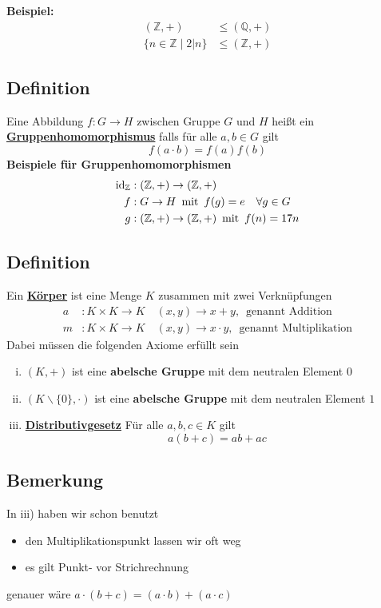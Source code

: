 \textbf{Beispiel:}
\begin{align*}
( \mathds{Z}, +) &\leq (\mathds{Q},+) \\
\{ n  \in \mathds{Z} \mid 2|n \} &\leq (\mathds{Z},+)
\end{align*}

\subsection{Definition}
Eine Abbildung \(f: G \rightarrow H \) zwischen Gruppe \(G\) und \(H\) heißt ein 
\underline{\textbf{Gruppenhomomorphismus}} falls für alle \(a,b \in G\) gilt
\[
f(a \cdot b) = f(a) f(b)
\]
\textbf{Beispiele für Gruppenhomomorphismen}
\begin{align*}
\operatorname{id}_{\mathbb{Z}} &: (\mathbb{Z},+) \rightarrow (\mathbb{Z},+) \\
f &: G \rightarrow H \enspace \text{mit} \enspace f(g)=e \quad \forall g \in G \\
g &: (\mathbb{Z},+) \rightarrow (\mathbb{Z},+) \enspace \text{mit} \enspace f(n)=17n
\end{align*}

\subsection{Definition}
Ein \underline{\textbf{Körper}} ist eine Menge \(K\) zusammen mit zwei Verknüpfungen
\begin{align*}
a &: K \times K \rightarrow K \quad (x,y) \rightarrow x+y, \enspace \text{genannt Addition} \\
m &: K \times K \rightarrow K \quad (x,y) \rightarrow x \cdot y, \enspace \text{genannt Multiplikation}
\end{align*}
Dabei müssen die folgenden Axiome erfüllt sein
\begin{enumerate}[i)]
\item \( (K,+) \) ist eine \textbf{abelsche Gruppe} mit dem neutralen Element \(0\)
\item \( (K \backslash \{0\}, \cdot )\) ist eine \textbf{abelsche Gruppe} mit dem neutralen Element \(1\)
\item \underline{\textbf{Distributivgesetz}} Für alle \( a,b,c \in K\) gilt 
\[
a(b+c)=ab+ ac
\]
\end{enumerate}
\subsection{Bemerkung}
In iii) haben wir schon benutzt
\begin{itemize}
\item den Multiplikationspunkt lassen wir oft weg
\item es gilt Punkt- vor Strichrechnung 
\end{itemize}
genauer wäre \( a \cdot (b+c)=(a \cdot b ) +(a \cdot c ) \)

